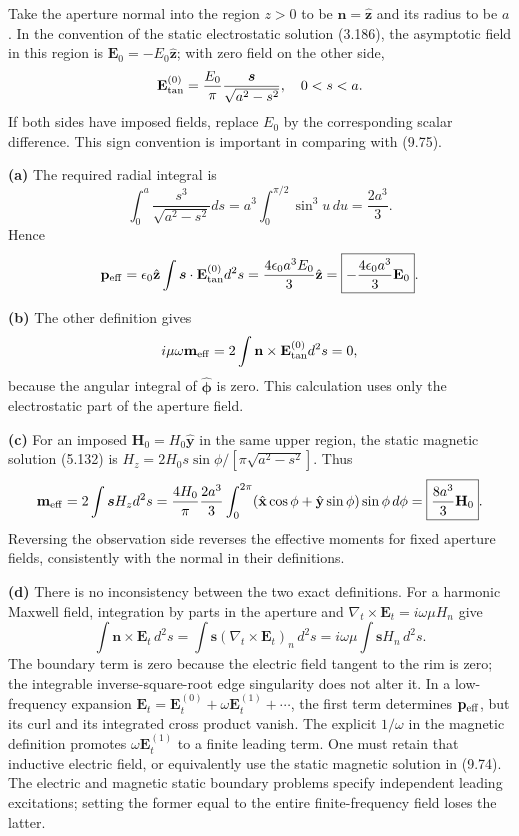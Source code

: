 Take the aperture normal into the region $z>0$ to be
$\mathbf n=\hat{\mathbf z}$ and its radius to be $a$.
In the convention of the static electrostatic solution (3.186), the
asymptotic field in this region is $\mathbf E_0=-E_0\hat{\mathbf z}$;
with zero field on the other side,
\[
\mathbf E_{\rm tan}^{(0)}=\frac{E_0}{\pi}
\frac{\boldsymbol s}{\sqrt{a^2-s^2}},\quad 0<s<a.
\]
If both sides have imposed fields, replace $E_0$ by the corresponding
scalar difference. This sign convention is important in comparing
with (9.75).

\textbf{(a)} The required radial integral is
\[
\int_0^a\frac{s^3}{\sqrt{a^2-s^2}}ds
=a^3\int_0^{\pi/2}\sin^3u\,du=\frac{2a^3}{3}.
\]
Hence
\[
\mathbf p_{\rm eff}=\epsilon_0\hat{\mathbf z}\int
\boldsymbol s\cdot\mathbf E_{\rm tan}^{(0)}d^2s
=\frac{4\epsilon_0a^3E_0}{3}\hat{\mathbf z}
=\boxed{-\frac{4\epsilon_0a^3}{3}\mathbf E_0}.
\]

\textbf{(b)} The other definition gives
\[
i\mu\omega\mathbf m_{\rm eff}
=2\int\mathbf n\times\mathbf E_{\rm tan}^{(0)}d^2s=0,
\]
because the angular integral of $\hat{\boldsymbol\phi}$ is zero.
This calculation uses only the electrostatic part of the aperture field.

\textbf{(c)} For an imposed $\mathbf H_0=H_0\hat{\mathbf y}$ in the
same upper region, the static magnetic solution (5.132) is
$H_z=2H_0s\sin\phi/[\pi\sqrt{a^2-s^2}]$.
Thus
\[
\mathbf m_{\rm eff}=2\int\boldsymbol s H_zd^2s
=\frac{4H_0}{\pi}\frac{2a^3}{3}
\int_0^{2\pi}(\hat{\mathbf x}\cos\phi+
\hat{\mathbf y}\sin\phi)\sin\phi\,d\phi
=\boxed{\frac{8a^3}{3}\mathbf H_0}.
\]
Reversing the observation side reverses the effective moments for fixed
aperture fields, consistently with the normal in their definitions.

\textbf{(d)} There is no inconsistency between the two exact definitions.
For a harmonic Maxwell field, integration by parts in the aperture and
$\nabla_t\times\mathbf E_t=i\omega\mu H_n$ give
\[
\int\mathbf n\times\mathbf E_t\,d^2s
=\int\boldsymbol s(\nabla_t\times\mathbf E_t)_n\,d^2s
=i\omega\mu\int\boldsymbol sH_n\,d^2s.
\]
The boundary term is zero because the electric field tangent to the
rim is zero; the integrable inverse-square-root edge singularity does
not alter it. In a low-frequency expansion
$\mathbf E_t=\mathbf E_t^{(0)}+\omega\mathbf E_t^{(1)}+\cdots$,
the first term determines $\mathbf p_{\rm eff}$, but its curl and its
integrated cross product vanish. The explicit $1/\omega$ in the magnetic
definition promotes $\omega\mathbf E_t^{(1)}$ to a finite leading term.
One must retain that inductive electric field, or equivalently use the
static magnetic solution in (9.74). The electric and magnetic static
boundary problems specify independent leading excitations; setting the
former equal to the entire finite-frequency field loses the latter.

